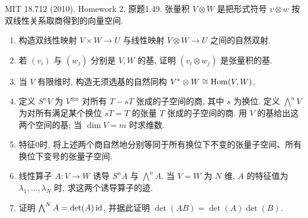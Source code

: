 \begin{exercise}\label{hw:1.49}
MIT 18.712 (2010), Homework 2, 原题1.49. 张量积 $V\otimes W$ 是把形式符号 $v\otimes w$ 按双线性关系取商得到的向量空间.
\begin{enumerate}[label=(\alph*)]
\item 构造双线性映射 $V\times W\to U$ 与线性映射 $V\otimes W\to U$ 之间的自然双射.
\item 若 $(v_i)$ 与 $(w_j)$ 分别是 $V,W$ 的基, 证明 $(v_i\otimes w_j)$ 是张量积的基.
\item 当 $V$ 有限维时, 构造无须选基的自然同构 $V^*\otimes W\cong\operatorname{Hom}(V,W)$.
\item 定义 $S^nV$ 为 $V^{\otimes n}$ 对所有 $T-sT$ 张成的子空间的商, 其中 $s$ 为换位. 定义 $\bigwedge^nV$ 为对所有满足某个换位 $sT=T$ 的张量 $T$ 张成的子空间的商. 用 $V$ 的基给出这两个空间的基; 当 $\dim V=m$ 时求维数.
\item 特征0时, 将上述两个商自然地分别等同于所有换位下不变的张量子空间、所有换位下变号的张量子空间.
\item 线性算子 $A:V\to W$ 诱导 $S^nA$ 与 $\bigwedge^nA$. 当 $V=W$ 为 $N$ 维, $A$ 的特征值为 $\lambda_1,\ldots,\lambda_N$ 时, 求这两个诱导算子的迹.
\item 证明 $\bigwedge^N A=\det(A)\operatorname{id}$, 并据此证明 $\det(AB)=\det(A)\det(B)$.
\end{enumerate}
\end{exercise}
